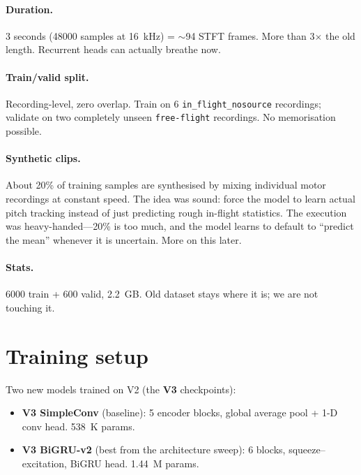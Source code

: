 \documentclass[11pt,a4paper]{article}
\begin{document}
\paragraph{Duration.} 3 seconds (48000 samples at 16~kHz) = $\sim$94 STFT
frames. More than 3$\times$ the old length. Recurrent heads can actually
breathe now.

\paragraph{Train/valid split.} Recording-level, zero overlap. Train on 6
\texttt{in\_flight\_nosource} recordings; validate on two completely
unseen \texttt{free-flight} recordings. No memorisation possible.

\paragraph{Synthetic clips.} About 20\% of training samples are synthesised
by mixing individual motor recordings at constant speed. The idea was sound:
force the model to learn actual pitch tracking instead of just predicting
rough in-flight statistics. The execution was heavy-handed---20\% is too
much, and the model learns to default to ``predict the mean'' whenever it
is uncertain. More on this later.

\paragraph{Stats.} 6000 train + 600 valid, 2.2~GB. Old dataset stays where
it is; we are not touching it.

\section{Training setup}

Two new models trained on V2 (the \textbf{V3} checkpoints):

\begin{itemize}
  \item \textbf{V3 SimpleConv} (baseline): 5 encoder blocks, global average
    pool + 1-D conv head. 538~K params.
  \item \textbf{V3 BiGRU-v2} (best from the architecture sweep): 6 blocks,
    squeeze--excitation, BiGRU head. 1.44~M params.
\end{itemize}
\end{document}
